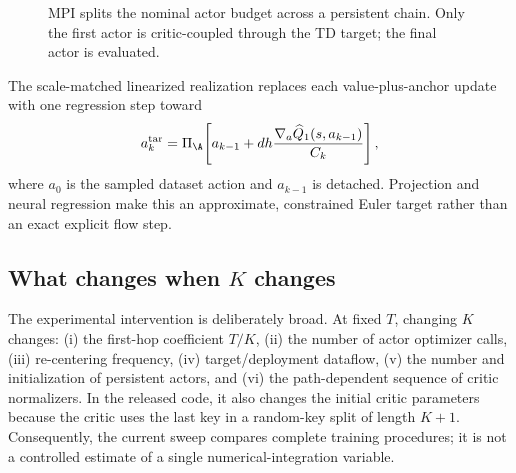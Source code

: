 \begin{figure}[t]
\centering
{}
\caption{MPI splits the nominal actor budget across a persistent chain. Only the first actor is critic-coupled through the TD target; the final actor is evaluated.}
\label{fig:architecture}
\end{figure}

The scale-matched linearized realization replaces each value-plus-anchor update with one regression step toward
\begin{equation}
 a_k^{\rm tar}
 =\Pi_{\A}\!\left[a_{k-1}
 +d h\frac{\nabla_a\widehat Q_1(s,a_{k-1})}{C_k}\right],           \label{eq:linearized}
\end{equation}
where $a_0$ is the sampled dataset action and $a_{k-1}$ is detached. Projection and neural regression make this an approximate, constrained Euler target rather than an exact explicit flow step.

\subsection{What changes when $K$ changes}

The experimental intervention is deliberately broad. At fixed $T$, changing $K$ changes: (i) the first-hop coefficient $T/K$, (ii) the number of actor optimizer calls, (iii) re-centering frequency, (iv) target/deployment dataflow, (v) the number and initialization of persistent actors, and (vi) the path-dependent sequence of critic normalizers. In the released code, it also changes the initial critic parameters because the critic uses the last key in a random-key split of length $K+1$. Consequently, the current sweep compares complete training procedures; it is not a controlled estimate of a single numerical-integration variable.

